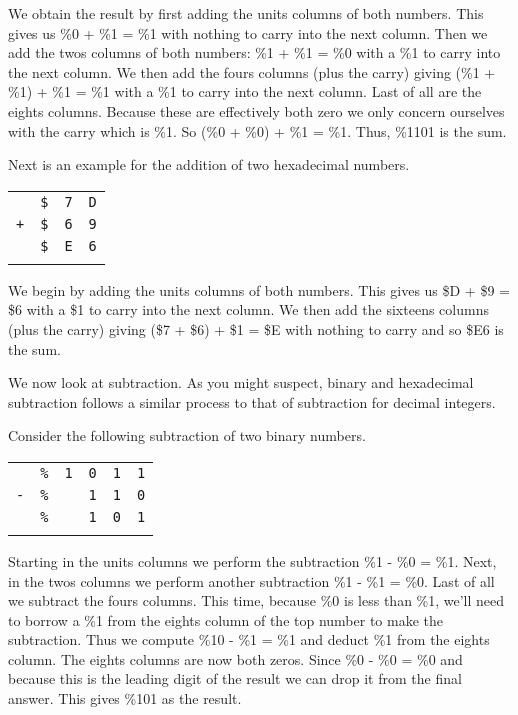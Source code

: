 We obtain the result by first adding the units columns of both numbers. This gives us \%0 + \%1 = \%1 with nothing to carry into the next column. Then we add the twos columns of both numbers: \%1 + \%1 = \%0 with a \%1 to carry into the next column. We then add the fours columns (plus the carry) giving (\%1 + \%1) + \%1 = \%1 with a \%1 to carry into the next column. Last of all are the eights columns. Because these are effectively both zero we only concern ourselves with the carry which is \%1. So (\%0 + \%0) + \%1 = \%1. Thus, \%1101 is the sum.

Next is an example for the addition of two hexadecimal numbers.
\begin{center}
	\begin{tabular}{cccc}
						 & \texttt{\$} & \texttt{7} & \texttt{D} \\
	\texttt{+} & \texttt{\$} & \texttt{6} & \texttt{9} \\ \hline
             & \texttt{\$} & \texttt{E} & \texttt{6} \\ \hhline{====}
	\end{tabular}
\end{center}

We begin by adding the units columns of both numbers. This gives us \$D + \$9 = \$6 with a \$1 to carry into the next column. We then add the sixteens columns (plus the carry) giving (\$7 + \$6) + \$1 = \$E with nothing to carry and so \$E6 is the sum.

We now look at subtraction. As you might suspect, binary and hexadecimal subtraction follows a similar process to that of subtraction for decimal integers.

Consider the following subtraction of two binary numbers.

\begin{center}
	\begin{tabular}{cccccc}
							& \texttt{\%} & \texttt{1} & \texttt{0} & \texttt{1} & \texttt{1} \\
	\texttt{-}	& \texttt{\%} &            & \texttt{1} & \texttt{1} & \texttt{0} \\ \hline
						  & \texttt{\%} &            & \texttt{1} & \texttt{0} & \texttt{1} \\ \hhline{======}
	\end{tabular}
\end{center}
Starting in the units columns we perform the subtraction \%1 - \%0 = \%1. Next, in the twos columns we perform another subtraction \%1 - \%1 = \%0. Last of all we subtract the fours columns. This time, because \%0 is less than \%1, we'll need to borrow a \%1 from the eights column of the top number to make the subtraction. Thus we compute \%10 - \%1 = \%1 and deduct \%1 from the eights column. The eights columns are now both zeros. Since \%0 - \%0 = \%0 and because this is the leading digit of the result we can drop it from the final answer. This gives \%101 as the result.

